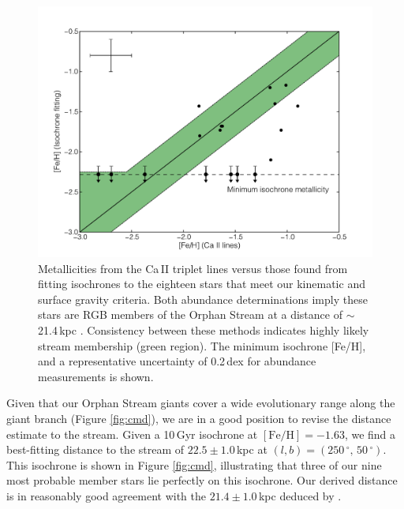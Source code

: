 \documentclass{emulateapj}
\begin{document}
\begin{figure}[h]
	\includegraphics[width=\columnwidth]{./figures/feh.pdf}
	\caption{Metallicities from the Ca\,\textsc{II} triplet lines versus those found from fitting isochrones to the eighteen stars that meet our kinematic and surface gravity criteria. Both abundance determinations imply these stars are RGB members of the Orphan Stream at a distance of $\sim$21.4\,kpc \citep{Newberg;et-al_2010}. Consistency between these methods indicates highly likely stream membership (green region). The minimum isochrone [Fe/H], and a representative uncertainty of 0.2\,dex for abundance measurements is shown.}
	\label{fig:feh}
\end{figure}



Given that our Orphan Stream giants cover a wide evolutionary range along the giant branch (Figure \ref{fig:cmd}), we are in a good position to revise the distance estimate to the stream. Given a 10\,Gyr \citet{Girardi;et-al_2008} isochrone at $[\mbox{Fe/H}] = -1.63$, we find a best-fitting distance to the stream of $22.5 \pm 1.0$\,kpc at $(l, b) = (250\,^\circ,\,50\,^\circ)$. This isochrone is shown in Figure \ref{fig:cmd}, illustrating that three of our nine most probable member stars lie perfectly on this isochrone. Our derived distance is in reasonably good agreement with the $21.4 \pm 1.0$\,kpc deduced by \citet{Newberg;et-al_2010}.
\end{document}
